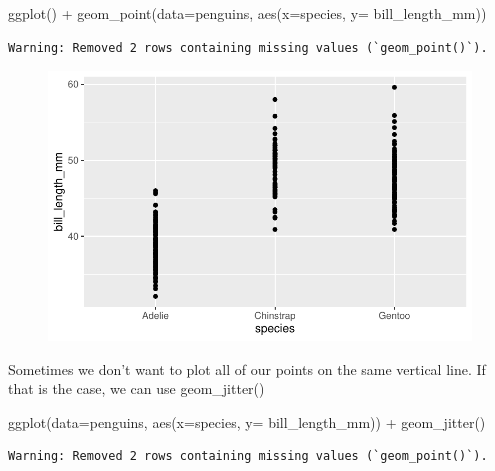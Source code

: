 \documentclass[
  letterpaper,
  DIV=11,
  numbers=noendperiod]{scrartcl}
\newenvironment{Shaded}{\begin{snugshade}}{\end{snugshade}}
\newcommand{\AttributeTok}[1]{\textcolor[rgb]{0.40,0.45,0.13}{#1}}
\newcommand{\FunctionTok}[1]{\textcolor[rgb]{0.28,0.35,0.67}{#1}}
\newcommand{\NormalTok}[1]{\textcolor[rgb]{0.00,0.23,0.31}{#1}}
\newcommand{\SpecialCharTok}[1]{\textcolor[rgb]{0.37,0.37,0.37}{#1}}
\begin{document}
\begin{Shaded}
\begin{Highlighting}[]
\FunctionTok{ggplot}\NormalTok{() }\SpecialCharTok{+}
  \FunctionTok{geom\_point}\NormalTok{(}\AttributeTok{data=}\NormalTok{penguins, }\FunctionTok{aes}\NormalTok{(}\AttributeTok{x=}\NormalTok{species, }\AttributeTok{y=}\NormalTok{ bill\_length\_mm))}
\end{Highlighting}
\end{Shaded}

\begin{verbatim}
Warning: Removed 2 rows containing missing values (`geom_point()`).
\end{verbatim}

\begin{figure}[H]

{\centering \includegraphics{basic_graphs_files/figure-pdf/unnamed-chunk-16-1.pdf}

}

\end{figure}

Sometimes we don't want to plot all of our points on the same vertical
line. If that is the case, we can use geom\_jitter()

\begin{Shaded}
\begin{Highlighting}[]
\FunctionTok{ggplot}\NormalTok{(}\AttributeTok{data=}\NormalTok{penguins, }\FunctionTok{aes}\NormalTok{(}\AttributeTok{x=}\NormalTok{species, }\AttributeTok{y=}\NormalTok{ bill\_length\_mm)) }\SpecialCharTok{+}
  \FunctionTok{geom\_jitter}\NormalTok{()}
\end{Highlighting}
\end{Shaded}

\begin{verbatim}
Warning: Removed 2 rows containing missing values (`geom_point()`).
\end{verbatim}
\end{document}
